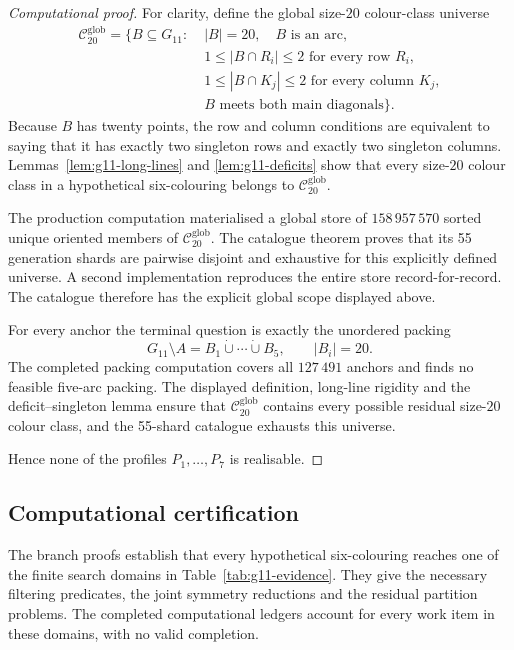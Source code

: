 \documentclass[11pt]{article}
\theoremstyle{definition}
\theoremstyle{remark}
\renewcommand{\le}{\leqslant}
\begin{document}
\begin{proof}[Computational proof]
For clarity, define the global size-\(20\) colour-class universe
\[
\begin{aligned}
\mathcal C^{\mathrm{glob}}_{20}=\bigl\{B\subseteq G_{11}:\;&
 |B|=20,\quad B\text{ is an arc},\\
& 1\le |B\cap R_i|\le2\text{ for every row }R_i,\\
& 1\le |B\cap K_j|\le2\text{ for every column }K_j,\\
& B\text{ meets both main diagonals}\bigr\}.
\end{aligned}
\]
Because \(B\) has twenty points, the row and column conditions are equivalent
to saying that it has exactly two singleton rows and exactly two singleton
columns.  Lemmas~\ref{lem:g11-long-lines} and \ref{lem:g11-deficits} show that
every size-\(20\) colour class in a hypothetical six-colouring belongs to
\(\mathcal C^{\mathrm{glob}}_{20}\).

The production computation materialised a global store of
\(158\,957\,570\) sorted unique oriented members of
\(\mathcal C^{\mathrm{glob}}_{20}\).  The catalogue theorem
proves that its 55 generation shards are pairwise disjoint and exhaustive for
this explicitly defined universe.  A second implementation reproduces the entire store record-for-record.
The catalogue therefore has the explicit global scope displayed above.

For every anchor the terminal question is exactly the unordered packing
\[
  G_{11}\setminus A=B_1\dot\cup\cdots\dot\cup B_5,
  \qquad |B_i|=20.
\]
The completed packing computation covers all \(127\,491\) anchors and finds
no feasible five-arc packing.  The displayed definition, long-line rigidity
and the deficit--singleton lemma ensure that
\(\mathcal C^{\mathrm{glob}}_{20}\) contains every possible residual
size-\(20\) colour class, and the 55-shard catalogue exhausts this universe.

Hence none of the profiles \(P_1,\ldots,P_7\) is realisable.
\end{proof}

\subsection{Computational certification}
\label{sec:g11-certification}

The branch proofs establish that every hypothetical six-colouring reaches
one of the finite search domains in Table~\ref{tab:g11-evidence}.  They give
the necessary filtering predicates, the joint symmetry reductions and the
residual partition problems.  The completed computational ledgers account
for every work item in these domains, with no valid completion.
\end{document}
